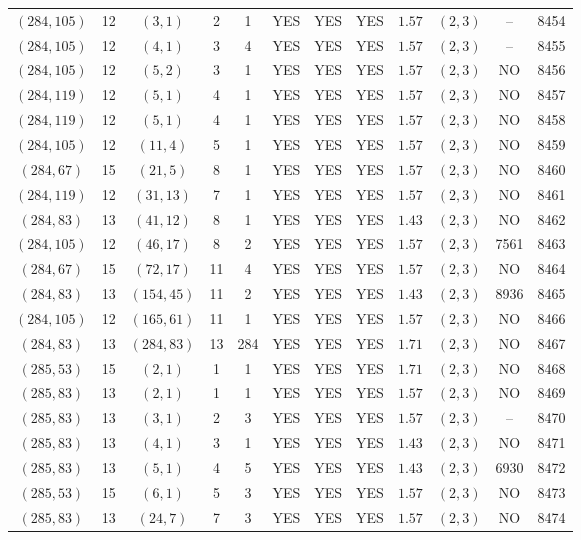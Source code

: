 \begin{longtable}{|c|c|c|c|c|c|c|c|c|c|c|c|}
$(284,105)$ & 12 & $(3,1)$ & 2 & 1 & YES & YES & YES & $1.57$ & $(2,3)$ & -- & 8454\\
$(284,105)$ & 12 & $(4,1)$ & 3 & 4 & YES & YES & YES & $1.57$ & $(2,3)$ & -- & 8455\\
$(284,105)$ & 12 & $(5,2)$ & 3 & 1 & YES & YES & YES & $1.57$ & $(2,3)$ & NO & 8456\\
$(284,119)$ & 12 & $(5,1)$ & 4 & 1 & YES & YES & YES & $1.57$ & $(2,3)$ & NO & 8457\\
$(284,119)$ & 12 & $(5,1)$ & 4 & 1 & YES & YES & YES & $1.57$ & $(2,3)$ & NO & 8458\\
$(284,105)$ & 12 & $(11,4)$ & 5 & 1 & YES & YES & YES & $1.57$ & $(2,3)$ & NO & 8459\\
$(284,67)$ & 15 & $(21,5)$ & 8 & 1 & YES & YES & YES & $1.57$ & $(2,3)$ & NO & 8460\\
$(284,119)$ & 12 & $(31,13)$ & 7 & 1 & YES & YES & YES & $1.57$ & $(2,3)$ & NO & 8461\\
$(284,83)$ & 13 & $(41,12)$ & 8 & 1 & YES & YES & YES & $1.43$ & $(2,3)$ & NO & 8462\\
$(284,105)$ & 12 & $(46,17)$ & 8 & 2 & YES & YES & YES & $1.57$ & $(2,3)$ & 7561 & 8463\\
$(284,67)$ & 15 & $(72,17)$ & 11 & 4 & YES & YES & YES & $1.57$ & $(2,3)$ & NO & 8464\\
$(284,83)$ & 13 & $(154,45)$ & 11 & 2 & YES & YES & YES & $1.43$ & $(2,3)$ & 8936 & 8465\\
$(284,105)$ & 12 & $(165,61)$ & 11 & 1 & YES & YES & YES & $1.57$ & $(2,3)$ & NO & 8466\\
$(284,83)$ & 13 & $(284,83)$ & 13 & 284 & YES & YES & YES & $1.71$ & $(2,3)$ & NO & 8467\\
$(285,53)$ & 15 & $(2,1)$ & 1 & 1 & YES & YES & YES & $1.71$ & $(2,3)$ & NO & 8468\\
$(285,83)$ & 13 & $(2,1)$ & 1 & 1 & YES & YES & YES & $1.57$ & $(2,3)$ & NO & 8469\\
$(285,83)$ & 13 & $(3,1)$ & 2 & 3 & YES & YES & YES & $1.57$ & $(2,3)$ & -- & 8470\\
$(285,83)$ & 13 & $(4,1)$ & 3 & 1 & YES & YES & YES & $1.43$ & $(2,3)$ & NO & 8471\\
$(285,83)$ & 13 & $(5,1)$ & 4 & 5 & YES & YES & YES & $1.43$ & $(2,3)$ & 6930 & 8472\\
$(285,53)$ & 15 & $(6,1)$ & 5 & 3 & YES & YES & YES & $1.57$ & $(2,3)$ & NO & 8473\\
$(285,83)$ & 13 & $(24,7)$ & 7 & 3 & YES & YES & YES & $1.57$ & $(2,3)$ & NO & 8474\\

\end{longtable}
